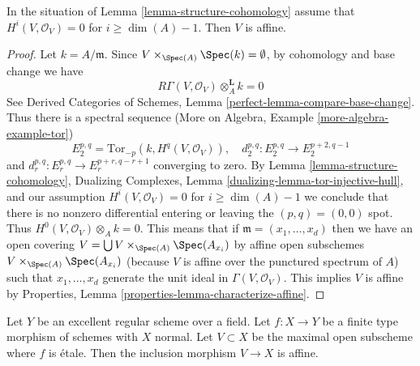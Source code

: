\begin{lemma}
\label{lemma-conclude}
In the situation of Lemma \ref{lemma-structure-cohomology}
assume that $H^i(V, \mathcal{O}_V) = 0$ for $i \geq \dim(A) - 1$.
Then $V$ is affine.
\end{lemma}

\begin{proof}
Let $k = A/\mathfrak m$. Since $V \times_{\Spec(A)} \Spec(k) = \emptyset$,
by cohomology and base change we have
$$
R\Gamma(V, \mathcal{O}_V) \otimes_A^\mathbf{L} k = 0
$$
See
Derived Categories of Schemes, Lemma \ref{perfect-lemma-compare-base-change}.
Thus there is a spectral sequence
(More on Algebra, Example \ref{more-algebra-example-tor})
$$
E_2^{p, q} = \text{Tor}_{-p}(k, H^q(V, \mathcal{O}_V)),\quad
d_2^{p, q} : E_2^{p, q} \to E_2^{p + 2, q - 1}
$$
and $d_r^{p, q} : E_r^{p, q} \to E_r^{p + r, q - r + 1}$
converging to zero. By Lemma \ref{lemma-structure-cohomology},
Dualizing Complexes, Lemma \ref{dualizing-lemma-tor-injective-hull},
and our assumption $H^i(V, \mathcal{O}_V) = 0$ for $i \geq \dim(A) - 1$
we conclude that there is no nonzero differential
entering or leaving the $(p, q) = (0, 0)$ spot. Thus
$H^0(V, \mathcal{O}_V) \otimes_A k = 0$. This means that
if $\mathfrak m = (x_1, \ldots, x_d)$ then we have
an open covering $V = \bigcup V \times_{\Spec(A)} \Spec(A_{x_i})$
by affine open subschemes $V \times_{\Spec(A)} \Spec(A_{x_i})$
(because $V$ is affine over the punctured spectrum of $A$)
such that $x_1, \ldots, x_d$ generate
the unit ideal in $\Gamma(V, \mathcal{O}_V)$.
This implies $V$ is affine by
Properties, Lemma \ref{properties-lemma-characterize-affine}.
\end{proof}

\begin{theorem}
\label{theorem-global}
Let $Y$ be an excellent regular scheme over a field. Let $f : X \to Y$
be a finite type morphism of schemes with $X$ normal. Let $V \subset X$
be the maximal open subscheme where $f$ is \'etale. Then the inclusion
morphism $V \to X$ is affine.
\end{theorem}

